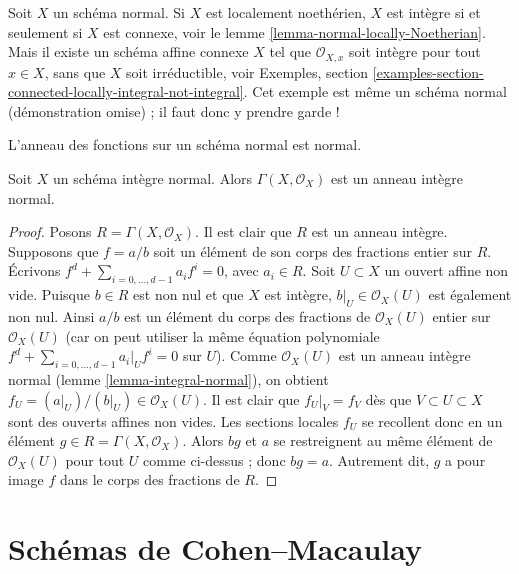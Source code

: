 \begin{remark}
\label{remark-normal-connected-irreducible}
Soit $X$ un schéma normal. Si $X$ est localement noethérien,
$X$ est intègre si et seulement si $X$ est connexe, voir le
lemme \ref{lemma-normal-locally-Noetherian}.
Mais il existe un schéma affine connexe $X$ tel que
$\mathcal{O}_{X, x}$ soit intègre pour tout $x \in X$, sans que $X$ soit
irréductible, voir Exemples, section
\ref{examples-section-connected-locally-integral-not-integral}.
Cet exemple est même un schéma normal (démonstration omise) ; il faut donc y prendre garde !
\end{remark}

\begin{lemma}
\label{lemma-normal-integral-sections}
\begin{slogan}
L'anneau des fonctions sur un schéma normal est normal.
\end{slogan}
Soit $X$ un schéma intègre normal.
Alors $\Gamma(X, \mathcal{O}_X)$ est un anneau intègre normal.
\end{lemma}

\begin{proof}
Posons $R = \Gamma(X, \mathcal{O}_X)$.
Il est clair que $R$ est un anneau intègre.
Supposons que $f = a/b$ soit un élément de son corps des fractions
entier sur $R$. Écrivons
$f^d + \sum_{i = 0, \ldots, d - 1} a_i f^i = 0$, avec
$a_i \in R$. Soit $U \subset X$ un ouvert affine non vide.
Puisque $b \in R$ est non nul et que $X$ est intègre,
$b|_U \in \mathcal{O}_X(U)$ est également non nul.
Ainsi $a/b$ est un élément du corps des fractions de
$\mathcal{O}_X(U)$ entier sur $\mathcal{O}_X(U)$
(car on peut utiliser la même équation polynomiale
$f^d + \sum_{i = 0, \ldots, d - 1} a_i|_U f^i = 0$ sur $U$).
Comme $\mathcal{O}_X(U)$ est un anneau intègre normal
(lemme \ref{lemma-integral-normal}), on obtient
$f_U = (a|_U)/(b|_U) \in \mathcal{O}_X(U)$. Il est clair
que $f_U|_V = f_V$ dès que $V \subset U \subset X$ sont des
ouverts affines non vides. Les sections locales $f_U$ se recollent donc en un élément
$g \in R = \Gamma(X, \mathcal{O}_X)$. Alors $bg$ et $a$
se restreignent au même élément de $\mathcal{O}_X(U)$ pour
tout $U$ comme ci-dessus ; donc $bg = a$. Autrement dit, $g$ a pour image $f$
dans le corps des fractions de $R$.
\end{proof}

\section{Schémas de Cohen--Macaulay}
\label{section-Cohen-Macaulay}


